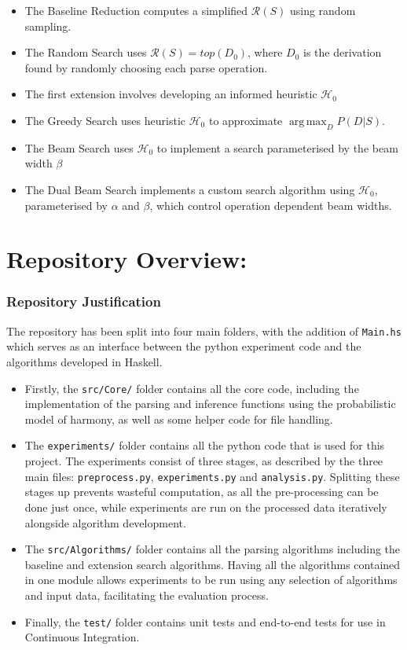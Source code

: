 \documentclass[12pt,a4paper,twoside,openright]{report}
\DeclareMathOperator*{\argmax}{arg\,max}
\theoremstyle{definition}
\begin{document}
\begin{itemize}
  \item The Baseline Reduction computes a simplified $\mathcal{R}(S)$ using random sampling. 
  \item The Random Search uses $\mathcal{R}(S) = top (D_0)$, where $D_0$ is the derivation found by randomly choosing each parse operation. 
  \item The first extension involves developing an informed heuristic $\mathcal{H}_0$
  \item The Greedy Search uses heuristic $\mathcal{H}_0$ to approximate $\argmax_D P(D|S)$.
  \item The Beam Search uses $\mathcal{H}_0$ to implement a search parameterised by the beam width $\beta$
  \item The Dual Beam Search implements a custom search algorithm using $\mathcal{H}_0$, parameterised by $\alpha$ and $\beta$, which control operation dependent beam widths.  
\end{itemize}

\section{Repository Overview:}

\subsubsection{Repository Justification}

The repository has been split into four main folders, with the addition of \texttt{Main.hs} which serves as an interface between the python experiment code and the algorithms developed in Haskell. 
\begin{itemize}
  \item Firstly, the \texttt{src/Core/} folder contains all the core code, including the implementation of the parsing  and inference functions using the probabilistic model of harmony, as well as some helper code for file handling. 
  \item The \texttt{experiments/} folder contains all the python code that is used for this project. The experiments consist of three stages, as described by the three main files: \texttt{preprocess.py}, \texttt{experiments.py} and \texttt{analysis.py}. Splitting these stages up prevents wasteful computation, as all the pre-processing can be done just once, while experiments are run on the processed data iteratively alongside algorithm development. 
  \item The \texttt{src/Algorithms/} folder contains all the parsing algorithms including the baseline and extension search algorithms. Having all the algorithms contained in one module allows experiments to be run using any selection of algorithms and input data, facilitating the evaluation process.  
  \item Finally, the \texttt{test/} folder contains unit tests and end-to-end tests for use in Continuous Integration.
\end{itemize}
\end{document}
